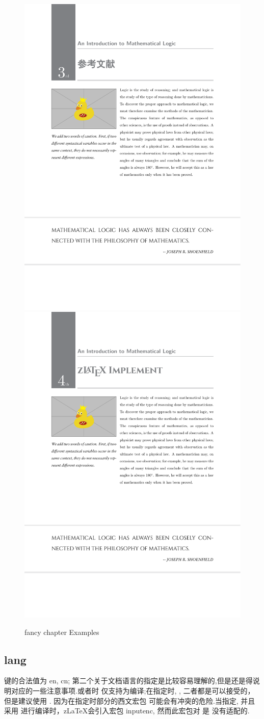 \begin{figure}[!htb]
  \includegraphics[width=.45\linewidth]{./pics/fancy_chapter_3.pdf}
  \includegraphics[width=.45\linewidth]{./pics/fancy_chapter_4.pdf}
  \caption{fancy chapter Examples}
  \label{fig:fancy-chapter-examples}
\end{figure}

\subsection{lang}
键的合法值为 {en, cn}; 第二个关于文档语言的指定是比较容易理解的,但是还是得说明对应的一些注意事项.或者时
仅支持为编译;在指定时, ,  二者都是可以接受的，但是建议使用 . 因为在指定时部分的西文宏包
可能会有冲突的危险.当指定, 并且采用  进行编译时，z\LaTeX{}会引入宏包 {inputenc}, 然而此宏包对  是
没有适配的.

